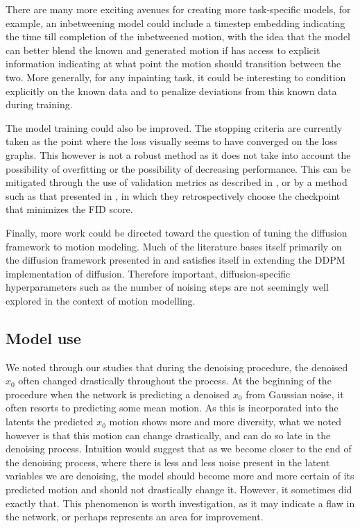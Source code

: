 There are many more exciting avenues for creating more task-specific models, for example, an inbetweening model could include a timestep embedding indicating the time till completion of the inbetweened motion, with the idea that the model can better blend the known and generated motion if has access to explicit information indicating at what point the motion should transition between the two. More generally, for any inpainting task, it could be interesting to condition explicitly on the known data and to penalize deviations from this known data during training.

The model training could also be improved. The stopping criteria are currently taken as the point where the loss visually seems to have converged on the loss graphs. This however is not a robust method as it does not take into account the possibility of overfitting or the possibility of decreasing performance. This can be mitigated through the use of validation metrics as described in , or by a method such as that presented in \cite{MDM}, in which they retrospectively choose the checkpoint that minimizes the FID score.

Finally, more work could be directed toward the question of tuning the diffusion framework to motion modeling. Much of the literature \cite{EDGE,MDM,PhysDiff} bases itself primarily on the diffusion framework presented in \cite{ddpm} and satisfies itself in extending the DDPM implementation of diffusion. Therefore important, diffusion-specific hyperparameters such as the number of noising steps are not seemingly well explored in the context of motion modelling.

\subsection{Model use}

We noted through our studies that during the denoising procedure, the denoised $x_0$ often changed drastically throughout the process. At the beginning of the procedure when the network is predicting a denoised $x_0$ from Gaussian noise, it often resorts to predicting some mean motion. As this is incorporated into the latents the predicted $x_0$ motion shows more and more diversity, what we noted however is that this motion can change drastically, and can do so late in the denoising process. Intuition would suggest that as we become closer to the end of the denoising process, where there is less and less noise present in the latent variables we are denoising, the model should become more and more certain of its predicted motion and should not drastically change it. However, it sometimes did exactly that. This phenomenon is worth investigation, as it may indicate a flaw in the network, or perhaps represents an area for improvement.

